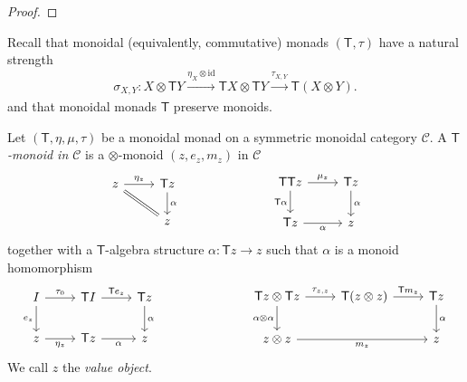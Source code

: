 \documentclass[11pt, oneside, article]{memoir}
\theoremstyle{definition}
\theoremstyle{plain}
\newenvironment{definition}
  {\pushQED{\qed}\renewcommand{\qedsymbol}{$\lozenge$}\definitionx}
  {\popQED\enddefinitionx}
\newcommand{\cat}[1]{\mathcal{#1}}%
\newcommand{\fun}[1]{\mathrm{#1}}%
\newcommand{\Fun}[1]{\mathsf{#1}}%
\newcommand{\id}{\mathrm{id}}
\newcommand{\To}[2][]{\xrightarrow[#1]{#2}}
\newcommand{\ev}{\fun{ev}}
\newcommand{\coev}{\fun{coev}}
\newcommand{\outp}[1]{#1^{+}}
\begin{document}
\begin{proof}
\end{proof}


Recall that monoidal (equivalently, commutative) monads $(\Fun{T},\tau)$ have a natural strength
\[
\sigma_{X,Y}\colon X\otimes\Fun{T}Y\To{\eta_X\otimes\id}\Fun{T}X\otimes\Fun{T}Y\To{\tau_{X,Y}}\Fun{T}(X\otimes Y).
\]
and that monoidal monads $\Fun{T}$ preserve monoids.

\begin{definition}\label{def.T_monoid}
Let $(\Fun{T},\eta,\mu,\tau)$ be a monoidal monad on a symmetric monoidal category $\cat{C}$. A \emph{$\Fun{T}$-monoid in $\cat{C}$} is a $\otimes$-monoid $(z,e_z,m_z)$ in $\cat{C}$
\[
\begin{tikzcd}[ampersand replacement=\&]
z\ar[r,"\eta_z"]\ar[dr,equal]\& \Fun{T}z\ar[d,"\alpha"]\\
\& z
\end{tikzcd}
\hspace{1in}
\begin{tikzcd}[ampersand replacement=\&]
\Fun{T}\Fun{T}z\ar[r,"\mu_z"]\ar[d,"\Fun{T}\alpha"']\& \Fun{T}z\ar[d,"\alpha"]\\
\Fun{T}z\ar[r,"\alpha"']\& z
\end{tikzcd}
\]
together with a $\Fun{T}$-algebra structure $\alpha\colon\Fun{T}z\to z$ such that $\alpha$ is a monoid homomorphism
\begin{equation}\label{eqn.T_monoid}
\begin{tikzcd}[ampersand replacement=\&]
I\ar[r,"\tau_0"]\ar[d,"e_z"']\& \Fun{T}I\ar[r,"\Fun{T}e_z"]\& \Fun{T}z\ar[d,"\alpha"]\\
z\ar[r,"\eta_z"']\& \Fun{T}z\ar[r,"\alpha"']\& z
\end{tikzcd}
\hspace{1in}
\begin{tikzcd}[ampersand replacement=\&]
\Fun{T}z\otimes\Fun{T}z\ar[r,"\tau_{z,z}"]\ar[d,"\alpha\otimes\alpha"']\& \Fun{T}(z\otimes z)\ar[r,"\Fun{T}m_z"]\& \Fun{T}z\ar[d,"\alpha"]\\
z\otimes z\ar[rr,"m_z"']\&\& z
\end{tikzcd}
\end{equation}
We call $z$ the \emph{value object}.
\end{definition}
\end{document}
